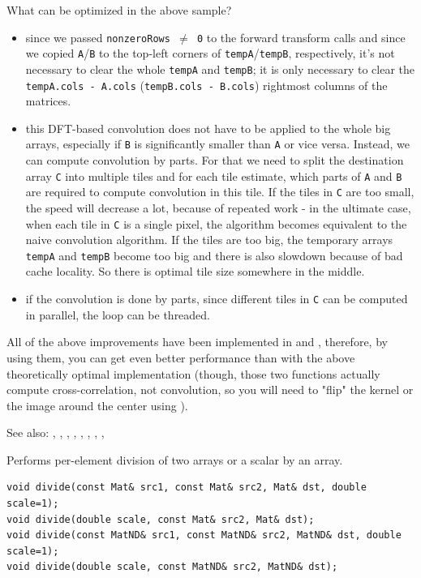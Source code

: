 What can be optimized in the above sample?
\begin{itemize}
    \item since we passed \texttt{nonzeroRows $\ne$ 0} to the forward transform calls and
    since we copied \texttt{A}/\texttt{B} to the top-left corners of \texttt{tempA}/\texttt{tempB}, respectively,
    it's not necessary to clear the whole \texttt{tempA} and \texttt{tempB};
    it is only necessary to clear the \texttt{tempA.cols - A.cols} (\texttt{tempB.cols - B.cols})
    rightmost columns of the matrices.
    \item this DFT-based convolution does not have to be applied to the whole big arrays,
    especially if \texttt{B} is significantly smaller than \texttt{A} or vice versa.
    Instead, we can compute convolution by parts. For that we need to split the destination array
    \texttt{C} into multiple tiles and for each tile estimate, which parts of \texttt{A} and \texttt{B}
    are required to compute convolution in this tile. If the tiles in \texttt{C} are too small,
    the speed will decrease a lot, because of repeated work - in the ultimate case, when each tile in \texttt{C} is a single pixel,
    the algorithm becomes equivalent to the naive convolution algorithm.
    If the tiles are too big, the temporary arrays \texttt{tempA} and \texttt{tempB} become too big
    and there is also slowdown because of bad cache locality. So there is optimal tile size somewhere in the middle.
    \item if the convolution is done by parts, since different tiles in \texttt{C} can be computed in parallel, the loop can be threaded.
\end{itemize}

All of the above improvements have been implemented in  and , therefore, by using them, you can get even better performance than with the above theoretically optimal implementation (though, those two functions actually compute cross-correlation, not convolution, so you will need to "flip" the kernel or the image around the center using ).

See also: , , , , , , , , 

\label{divide}

Performs per-element division of two arrays or a scalar by an array.

\begin{lstlisting}
void divide(const Mat& src1, const Mat& src2, Mat& dst, double scale=1);
void divide(double scale, const Mat& src2, Mat& dst);
void divide(const MatND& src1, const MatND& src2, MatND& dst, double scale=1);
void divide(double scale, const MatND& src2, MatND& dst);
\end{lstlisting}
\begin{description}
\end{description}

